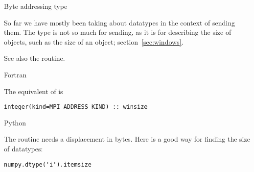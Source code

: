  {Byte addressing type}

So far we have mostly been taking about datatypes in the context of
sending them. The  type is not so much for
sending, as it is for describing the size of objects, such as the size
of an  object; section~\ref{sec:windows}.

See also the  routine.

 {Fortran}

The equivalent of  is
\lstset{style=reviewcode,language=Fortran}
\begin{lstlisting}
integer(kind=MPI_ADDRESS_KIND) :: winsize
\end{lstlisting}
\lstset{style=reviewcode,language=C}

 {Python}

The  routine needs a displacement in
bytes. Here is a good way for finding the size of  datatypes:
\begin{verbatim}
numpy.dtype('i').itemsize
\end{verbatim}


